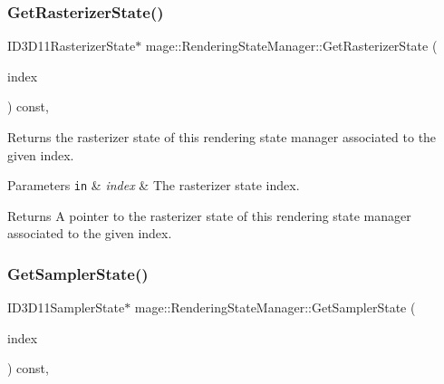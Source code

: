 \subsubsection{\texorpdfstring{Get\+Rasterizer\+State()}{GetRasterizerState()}}
{\footnotesize\ttfamily I\+D3\+D11\+Rasterizer\+State$\ast$ mage\+::\+Rendering\+State\+Manager\+::\+Get\+Rasterizer\+State (\begin{DoxyParamCaption}\item[{\hyperlink{classmage_1_1_rendering_state_manager_aa8eee3b02b7d4ba0a046870fae43640a}{Rasterizer\+State\+Index}}]{index }\end{DoxyParamCaption}) const\hspace{0.3cm}{\ttfamily [private]}, {\ttfamily [noexcept]}}

Returns the rasterizer state of this rendering state manager associated to the given index.


\begin{DoxyParams}[1]{Parameters}
\mbox{\tt in}  & {\em index} & The rasterizer state index. \\
\hline
\end{DoxyParams}
\begin{DoxyReturn}{Returns}
A pointer to the rasterizer state of this rendering state manager associated to the given index. 
\end{DoxyReturn}
\hypertarget{classmage_1_1_rendering_state_manager_a951faf4db49ae4260100949aa941fd65}{}\label{classmage_1_1_rendering_state_manager_a951faf4db49ae4260100949aa941fd65} 
\subsubsection{\texorpdfstring{Get\+Sampler\+State()}{GetSamplerState()}}
{\footnotesize\ttfamily I\+D3\+D11\+Sampler\+State$\ast$ mage\+::\+Rendering\+State\+Manager\+::\+Get\+Sampler\+State (\begin{DoxyParamCaption}\item[{\hyperlink{classmage_1_1_rendering_state_manager_a17ea0fda0247ee5d379b62a882db95a3}{Sampler\+State\+Index}}]{index }\end{DoxyParamCaption}) const\hspace{0.3cm}{\ttfamily [private]}, {\ttfamily [noexcept]}}

